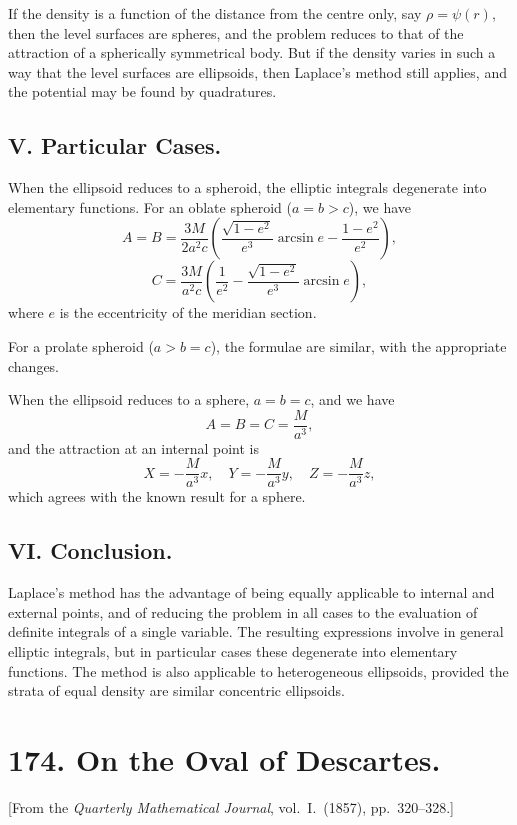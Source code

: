 \documentclass[11pt,a4paper]{book}
\begin{document}
If the density is a function of the distance from the centre only, say $\rho=\psi(r)$, then the level surfaces are spheres, and the problem reduces to that of the attraction of a spherically symmetrical body. But if the density varies in such a way that the level surfaces are ellipsoids, then Laplace's method still applies, and the potential may be found by quadratures.

\subsection*{V. Particular Cases.}

When the ellipsoid reduces to a spheroid, the elliptic integrals degenerate into elementary functions. For an oblate spheroid ($a=b>c$), we have
\[
A = B = \frac{3M}{2a^2c}\left(\frac{\sqrt{1-e^2}}{e^3}\arcsin e - \frac{1-e^2}{e^2}\right),
\]
\[
C = \frac{3M}{a^2c}\left(\frac{1}{e^2} - \frac{\sqrt{1-e^2}}{e^3}\arcsin e\right),
\]
where $e$ is the eccentricity of the meridian section.

For a prolate spheroid ($a>b=c$), the formulae are similar, with the appropriate changes.

When the ellipsoid reduces to a sphere, $a=b=c$, and we have
\[
A = B = C = \frac{M}{a^3},
\]
and the attraction at an internal point is
\[
X = -\frac{M}{a^3}x,\quad Y = -\frac{M}{a^3}y,\quad Z = -\frac{M}{a^3}z,
\]
which agrees with the known result for a sphere.

\subsection*{VI. Conclusion.}

Laplace's method has the advantage of being equally applicable to internal and external points, and of reducing the problem in all cases to the evaluation of definite integrals of a single variable. The resulting expressions involve in general elliptic integrals, but in particular cases these degenerate into elementary functions. The method is also applicable to heterogeneous ellipsoids, provided the strata of equal density are similar concentric ellipsoids.


\newpage
\section*{174. On the Oval of Descartes.}

[From the \textit{Quarterly Mathematical Journal}, vol.~I.~(1857), pp.~320--328.]
\end{document}
